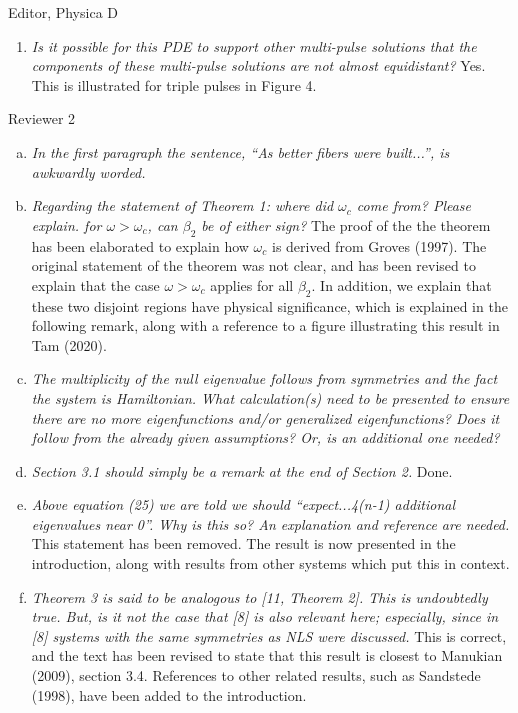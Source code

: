 \documentclass[11pt]{letter}
\begin{document}
\begin{letter}{Editor, Physica D}
\begin{enumerate}
\item \emph{Is it possible for this PDE to support other multi-pulse solutions that the components of these multi-pulse solutions are not almost equidistant?} Yes. This is illustrated for triple pulses in Figure 4.
\vspace{4mm}
\end{enumerate}

Reviewer 2
\begin{enumerate}[(a)]
\item \emph{In the first paragraph the sentence, ``As better fibers were built...'', is awkwardly worded.}
\vspace{4mm}

\item \emph{Regarding the statement of Theorem 1: where did $\omega_c$ come from? Please explain.
for $\omega > \omega_c$, can $\beta_2$ be of either sign?} The proof of the the theorem has been elaborated to explain how $\omega_c$ is derived from Groves (1997). The original statement of the theorem was not clear, and has been revised to explain that the case $\omega > \omega_c$ applies for all $\beta_2$. In addition, we explain that these two disjoint regions have physical significance, which is explained in the following remark, along with a reference to a figure illustrating this result in Tam (2020).
\vspace{4mm}

\item \emph{The multiplicity of the null eigenvalue follows from symmetries and the fact the system is Hamiltonian. What calculation(s) need to be presented to ensure there are no more eigenfunctions and/or generalized eigenfunctions? Does it follow from the already given assumptions? Or, is an additional one needed?}
\vspace{4mm}

\item \emph{Section 3.1 should simply be a remark at the end of Section 2.} Done.
\vspace{4mm}

\item \emph{Above equation (25) we are told we should ``expect...4(n-1) additional eigenvalues  near 0''. Why is this so? An explanation and reference are needed.} This statement has been removed. The result is now presented in the introduction, along with results from other systems which put this in context.
\vspace{4mm}

\item \emph{Theorem 3 is said to be analogous to [11, Theorem 2]. This is undoubtedly true. But, is it not the case that [8] is also relevant here; especially, since in [8] systems with the same symmetries as NLS were discussed.} This is correct, and the text has been revised to state that this result is closest to Manukian (2009), section 3.4. References to other related results, such as Sandstede (1998), have been added to the introduction.
\vspace{4mm}


\end{enumerate}
\end{letter}
\end{document}
